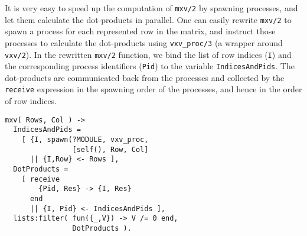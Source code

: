 It is very easy to speed up the computation of \lstinline[language=myerlang]{mxv/2} by
spawning processes, and let them calculate the dot-products in parallel.
One can easily
rewrite \lstinline[language=myerlang]{mxv/2} to spawn a process for each represented row in
the matrix, and instruct those processes to calculate the dot-products
using \lstinline[language=myerlang]{vxv_proc/3} (a wrapper around \lstinline[language=myerlang]{vxv/2}). In the rewritten
\lstinline[language=myerlang]{mxv/2} function, we bind the list of row indices (\lstinline[language=myerlang]{I}) and
the corresponding process identifiers (\lstinline[language=myerlang]{Pid}) to the variable
\lstinline[language=myerlang]{IndicesAndPids}. The dot-products are communicated back from the
processes and collected by the \lstinline[language=myerlang]{receive} expression in the
spawning order of the processes, and hence in the order of row indices.

\begin{lstlisting}[language=myerlang]
mxv( Rows, Col ) ->
  IndicesAndPids =
    [ {I, spawn(?MODULE, vxv_proc,
                [self(), Row, Col]
      || {I,Row} <- Rows ],
  DotProducts =
    [ receive
        {Pid, Res} -> {I, Res}
      end
      || {I, Pid} <- IndicesAndPids ],
  lists:filter( fun({_,V}) -> V /= 0 end,
                DotProducts ).
\end{lstlisting}


